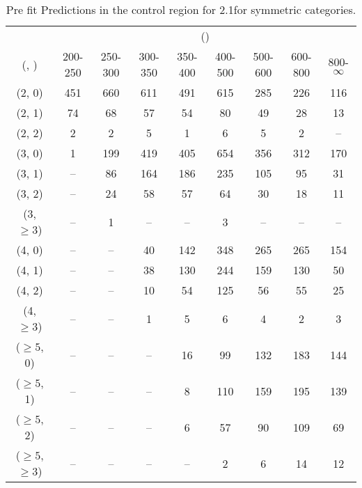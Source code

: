 \begin{table}[h!]
\tiny
\centering
\caption{Pre fit Predictions in the \mj control region for 2.1\ifb for symmetric categories.\label{tab:predsepnaive_mu_data_sym}}
\begin{tabular}
{ccccccccc}
	\hline\hline
	& \multicolumn{8}{c}{\scalht (\gev)} \\ 
	 (\njet,  \nb) & 200-250 & 250-300 & 300-350 & 350-400 & 400-500 & 500-600 & 600-800 & 800-$\infty$ \\ [0.8ex] 
\hline
	(2, 0) & 451 & 660 & 611 & 491 & 615 & 285 & 226 & 116 \\[0.5ex] 
	(2, 1) & 74 & 68 & 57 & 54 & 80 & 49 & 28 & 13 \\[0.5ex] 
	(2, 2) & 2 & 2 & 5 & 1 & 6 & 5 & 2 & -- \\[0.5ex] 
	(3, 0) & 1 & 199 & 419 & 405 & 654 & 356 & 312 & 170 \\[0.5ex] 
	(3, 1) & -- & 86 & 164 & 186 & 235 & 105 & 95 & 31 \\[0.5ex] 
	(3, 2) & -- & 24 & 58 & 57 & 64 & 30 & 18 & 11 \\[0.5ex] 
	(3, $\ge3$) & -- & 1 & -- & -- & 3 & -- & -- & -- \\[0.5ex] 
	(4, 0) & -- & -- & 40 & 142 & 348 & 265 & 265 & 154 \\[0.5ex] 
	(4, 1) & -- & -- & 38 & 130 & 244 & 159 & 130 & 50 \\[0.5ex] 
	(4, 2) & -- & -- & 10 & 54 & 125 & 56 & 55 & 25 \\[0.5ex] 
	(4, $\ge3$) & -- & -- & 1 & 5 & 6 & 4 & 2 & 3 \\[0.5ex] 
	($\ge5$, 0) & -- & -- & -- & 16 & 99 & 132 & 183 & 144 \\[0.5ex] 
	($\ge5$, 1) & -- & -- & -- & 8 & 110 & 159 & 195 & 139 \\[0.5ex] 
	($\ge5$, 2) & -- & -- & -- & 6 & 57 & 90 & 109 & 69 \\[0.5ex] 
	($\ge5$, $\ge3$) & -- & -- & -- & -- & 2 & 6 & 14 & 12 \\[0.5ex] 
	\hline
	\hline
\end{tabular}
\end{table}
